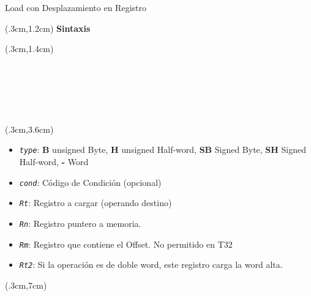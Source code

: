 \documentclass[usenames,table,dvipsnames,aspectratio=169]{beamer}
\begin{document}
\begin{frame}[fragile]{Load con Desplazamiento en Registro}
 \footnotesize
 \begin{textblock*}{\textwidth}(.3cm,1.2cm)
 \textbf{Sintaxis}
 \end{textblock*}
 \begin{textblock*}{\textwidth}(.3cm,1.4cm)
  \ttfamily \obeyspaces
  \\
  \\
  \\
  \\
  \\
  \\%
 \end{textblock*}
 \begin{textblock*}{\textwidth}(.3cm,3.6cm)
  \begin{itemize}
   \item<7-> []\textit{\texttt{type}}: \textbf{B} unsigned Byte, \textbf{H} unsigned Half-word, \textbf{SB} Signed Byte, \textbf{SH} Signed Half-word, \textbf{-} Word
   \item<8-> [] \texttt{\textit{cond}}: Código de Condición (opcional)
   \item<9-> [] \texttt{\textit{Rt}}:   Registro a cargar (operando destino)
   \item<10-> [] \textit{\texttt{Rn}}:   Registro puntero a memoria.
   \item<11-> [] \textit{\texttt{Rm}}:   Registro que contiene el Offset. No permitido en T32
   \item<12-> [] \texttt{\textit{Rt2}}:  Si la operación es de doble word, este registro carga la word alta.
  \end{itemize}
 \end{textblock*}
 \begin{textblock*}{\textwidth}(.3cm,7cm)

\end{textblock*}
\end{frame}
\end{document}
